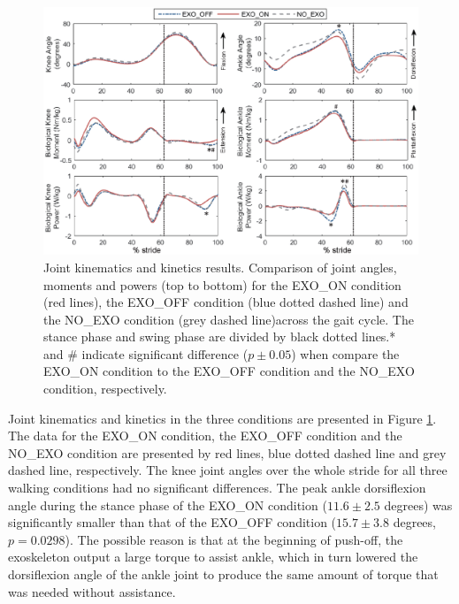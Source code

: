 \documentclass[twocolumn,cleanfoot,10pt]{asme2ej}
\begin{document}
\begin{figure}[th]
	\centering
	\includegraphics[width=17cm]{compare.eps}
	\caption{Joint kinematics and kinetics results. Comparison of joint angles, moments and powers (top to bottom) for the EXO\_ON condition (red lines), the EXO\_OFF condition (blue dotted dashed line) and the NO\_EXO condition (grey dashed line)across the gait cycle. The stance phase and swing phase are divided by black dotted lines.* and \# indicate significant difference ($p\pm0.05$) when compare the EXO\_ON condition to the EXO\_OFF condition and the NO\_EXO condition, respectively.}
	\label{fig:kinetics}
\end{figure}

Joint kinematics and kinetics in the three conditions are presented in Figure \ref{fig:kinetics}. The data for the EXO\_ON condition, the EXO\_OFF condition and the NO\_EXO condition are presented by red lines, blue dotted dashed line and grey dashed line, respectively. The knee joint angles over the whole stride for all three walking conditions had no significant differences. The peak ankle dorsiflexion angle during the stance phase of the EXO\_ON condition ($11.6\pm2.5$ degrees) was significantly smaller than that of the EXO\_OFF condition ($15.7\pm3.8$ degrees, $p=0.0298$). The possible reason is that at the beginning of push-off, the exoskeleton output a large torque to assist ankle, which in turn lowered the dorsiflexion angle of the ankle joint to produce the same amount of torque that was needed without assistance. 
\end{document}
